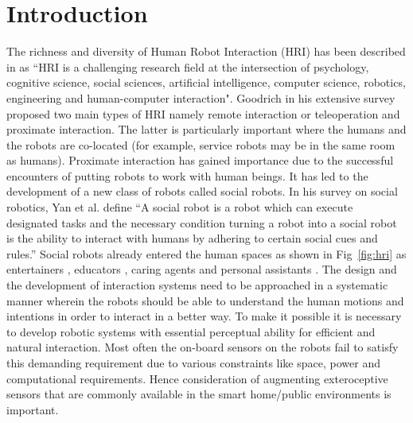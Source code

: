 \documentclass{llncs}
\begin{document}
\section{Introduction}
The richness and diversity of Human Robot Interaction (HRI) has been described in \cite{Dautenhahn2007} as ``HRI is a challenging research field at the intersection of psychology, cognitive science, social sciences, artificial intelligence, computer science, robotics, engineering and human-computer interaction". Goodrich \cite{Goodrich:2007:HIS:1348099.1348100} in his extensive survey proposed two main types of HRI namely remote interaction or teleoperation and proximate interaction. The latter is particularly important where the humans and the robots are co-located (for example, service robots may be in the same room as humans). Proximate interaction has gained importance due to the successful encounters of putting robots to work with human beings. It has led to the development of a new class of robots called social robots. In his survey on social robotics, Yan et al. \cite{Yan2014} define ``A social robot is a robot which can execute designated tasks and the necessary condition turning a robot into a social robot is the ability to interact with humans by adhering to certain social cues and rules.''
	Social robots already entered the human spaces as shown in Fig~\ref{fig:hri} as entertainers \cite{NaoTheRobot}, educators \cite{NaoTheRobot}, caring agents \cite{ASKNao} and personal assistants \cite{ProjectRomeo}\cite{PepperTheRobot}. The design and the development of interaction systems need to be approached in a systematic manner wherein the robots should be able to understand the human motions and intentions in order to interact in a better way. To make it possible it is necessary to develop robotic systems with essential perceptual ability for efficient and natural interaction. Most often the on-board sensors on the robots fail to satisfy this demanding requirement due to various constraints like space, power and computational requirements. Hence consideration of augmenting exteroceptive sensors that are commonly available in the smart home/public environments is important.
\end{document}
